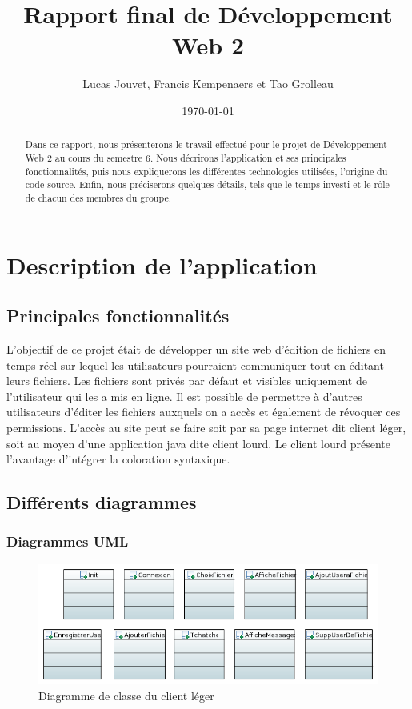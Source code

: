 \documentclass[a4paper, 12pt]{article}
\title{Rapport final de Développement Web 2}
\author{Lucas Jouvet, Francis Kempenaers et Tao Grolleau}
\date{\today}
\begin{document}
\maketitle

\begin{abstract}
  Dans ce rapport, nous présenterons le travail effectué pour le projet de Développement Web 2 au cours du semestre 6. Nous décrirons l'application et ses principales fonctionnalités, puis nous expliquerons les différentes technologies utilisées, l'origine du code source. Enfin, nous préciserons quelques détails, tels que le temps investi et le rôle de chacun des membres du groupe.
\end{abstract}

\newpage

\section{Description de l'application}

\subsection{Principales fonctionnalités}

L'objectif de ce projet était de développer un site web d'édition de fichiers en temps réel sur lequel les utilisateurs pourraient communiquer tout en éditant leurs fichiers. Les fichiers sont privés par défaut et visibles uniquement de l'utilisateur qui les a mis en ligne. Il est possible de permettre à d'autres utilisateurs d'éditer les fichiers auxquels on a accès et également de révoquer ces permissions. L'accès au site peut se faire soit par sa page internet dit client léger, soit au moyen d'une application java dite client lourd. Le client lourd présente l'avantage d'intégrer la coloration syntaxique.

\subsection{Différents diagrammes}

\subsubsection{Diagrammes UML}

\begin{figure}[H]
  \begin{center}
    \includegraphics{DiagrammeClientLeger.PNG}
  \end{center}
  \caption{Diagramme de classe du client léger}
\end{figure}
\end{document}
